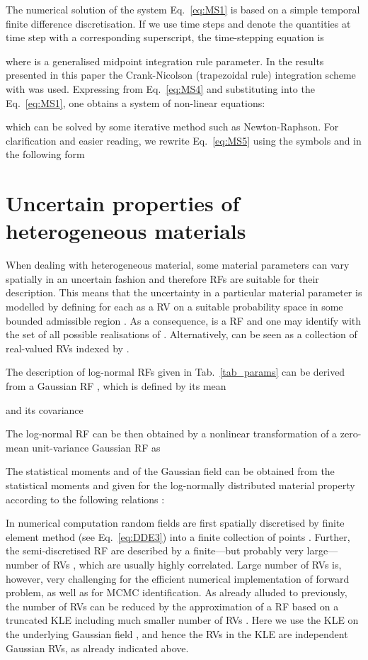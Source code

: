 \documentclass[preprint,12pt]{elsarticle}
\begin{document}
The numerical solution of the system
Eq.~\eqref{eq:MS1} is based on a simple temporal finite difference
discretisation.  If we use time steps  and denote the
quantities at time step  with a corresponding superscript,
the time-stepping equation is

where  is a generalised midpoint integration rule
parameter. In the results presented in this paper the
Crank-Nicolson (trapezoidal rule) integration scheme with  was used.  Expressing  from
Eq.~\eqref{eq:MS4} and substituting into the Eq.~\eqref{eq:MS1},
one obtains a system of non-linear equations:

which can be solved by some iterative method such as Newton-Raphson.
For clarification and easier reading, we rewrite Eq.~\eqref{eq:MS5}
using the symbols
 and  in the following form



\section{Uncertain properties of heterogeneous materials}
\label{sec:het}
When dealing with heterogeneous material, some material parameters can
vary spatially in an uncertain fashion and therefore RFs are
suitable for their description. This means that the uncertainty in
a particular material parameter  is modelled by defining
 for each  as a RV  on a suitable probability space
 in some bounded admissible region
. As a consequence,  is a RF and one may identify
 with the set of all possible realisations of .
Alternatively,
 can be seen as a collection of real-valued RVs
indexed by .

The description of log-normal RFs given in Tab.~\ref{tab_params} can
be derived from a Gaussian RF , which is defined
by its mean

and its covariance

The log-normal RF  can be then obtained by a
nonlinear transformation of a zero-mean unit-variance Gaussian RF
 \cite{Matthies:2007:IB, Rosic:2008:JSSCM} as

The statistical moments  and  of the Gaussian field
can be obtained from the statistical moments  and 
given for the log-normally distributed material property according to
the following relations \cite{Rosic:2008:JSSCM}:


In numerical computation random fields are first spatially discretised
by finite element method (see Eq.~\eqref{eq:DDE3}) into a finite
collection of points . Further, the
semi-discretised RF are described by a finite---but probably very
large---number of RVs , which are usually highly correlated. Large
number of RVs is, however, very challenging for the efficient
numerical implementation of forward problem, as well as for MCMC
identification. As already alluded to previously, the number of RVs
can be reduced by the approximation  of a RF
 based on a truncated KLE including much smaller
number of RVs \cite{Matthies:2007:IB, Marzouk:2009:JCP}.  Here we use
the KLE on the underlying Gaussian field , and hence
the RVs in the KLE are independent Gaussian RVs, as already indicated
above.
\end{document}
